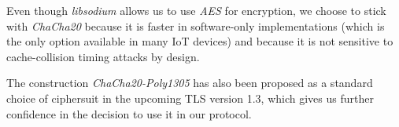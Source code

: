 Even though \emph{libsodium} allows us to use \emph{AES} for encryption, we
choose to stick with \emph{ChaCha20} because it is faster in software-only
implementations (which is the only option available in many IoT devices) and
because it is not sensitive to cache-collision timing attacks by design.

The construction \emph{ChaCha20-Poly1305} has also been proposed as a standard
choice of ciphersuit in the upcoming TLS version 1.3, which gives us further
confidence in the decision to use it in our protocol.
